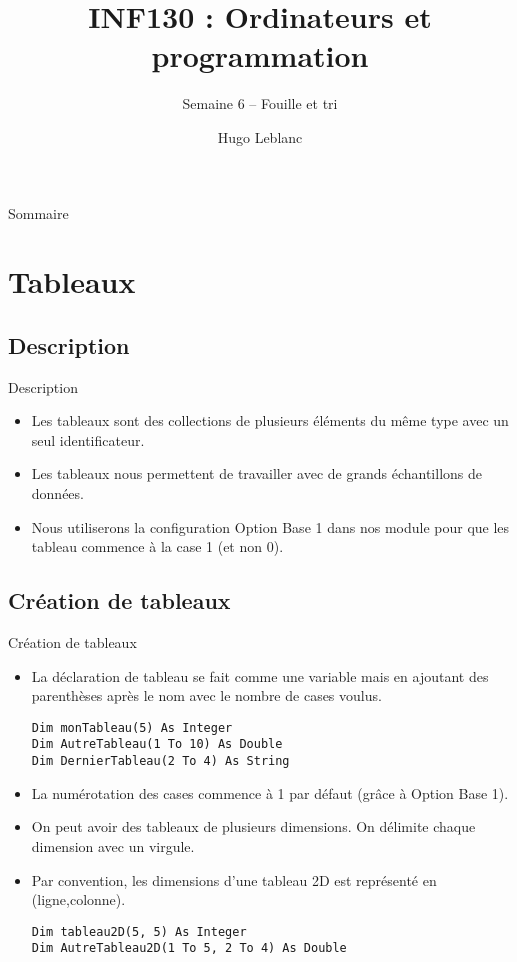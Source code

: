 \documentclass[aspectratio=169,usenames,dvipsnames]{beamer}
\title{INF130 : Ordinateurs et programmation}
\subtitle{Semaine 6 – Fouille et tri}
\author{Hugo Leblanc}
\begin{document}
    \maketitle

    \begin{frame}{Sommaire}
        \tableofcontents
    \end{frame}

    \section{Tableaux}
    \subsection{Description}
    \begin{frame}{Description}
        \begin{itemize}
            \item Les tableaux sont des collections de plusieurs éléments du même type avec un seul identificateur.
            \item Les tableaux nous permettent de travailler avec de grands échantillons de données.
            \item Nous utiliserons la configuration Option Base 1 dans nos module pour que les tableau commence à la case 1 (et non 0).
        \end{itemize}
    \end{frame}
    \subsection{Création de tableaux}
    \begin{frame}[fragile]{Création de tableaux}
        \begin{itemize}
            \item La déclaration de tableau se fait comme une variable mais en ajoutant des parenthèses après le nom avec le nombre de cases voulus.
\begin{lstlisting}
Dim monTableau(5) As Integer
Dim AutreTableau(1 To 10) As Double
Dim DernierTableau(2 To 4) As String
\end{lstlisting}
            \item La numérotation des cases commence à 1 par défaut (grâce à Option Base 1).
            \item On peut avoir des tableaux de plusieurs dimensions. On délimite chaque dimension avec un virgule.
            \item Par convention, les dimensions d’une tableau 2D est représenté en (ligne,colonne).
\begin{lstlisting}
Dim tableau2D(5, 5) As Integer
Dim AutreTableau2D(1 To 5, 2 To 4) As Double
\end{lstlisting}        
        \end{itemize}
    \end{frame}
\end{document}
